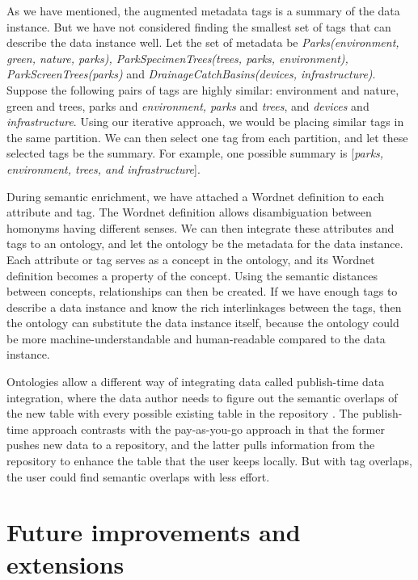 As we have mentioned, the augmented metadata tags is a summary of the data instance. But we have not considered finding the smallest set of tags that can describe the data instance well. Let the set of metadata be \textit{Parks(environment, green, nature, parks), ParkSpecimenTrees(trees, parks, environment), ParkScreenTrees(parks)} and \textit{DrainageCatchBasins(devices, infrastructure)}. Suppose the following pairs of tags are highly similar: environment and nature, green and trees, parks and \textit{environment, parks} and \textit{trees}, and \textit{devices} and \textit{infrastructure}. Using our iterative approach, we would be placing similar tags in the same partition. We can then select one tag from each partition, and let these selected tags be the summary. For example, one possible summary is [\textit{parks, environment, trees, and infrastructure}].

During semantic enrichment, we have attached a Wordnet definition to each attribute and tag. The Wordnet definition allows disambiguation between homonyms having different senses. We can then integrate these attributes and tags to an ontology, and let the ontology be the metadata for the data instance. Each attribute or tag serves as a concept in the ontology, and its Wordnet definition becomes a property of the concept. Using the semantic distances between concepts, relationships can then be created. If we have enough tags to describe a data instance and know the rich interlinkages between the tags, then the ontology can substitute the data instance itself, because the ontology could be more machine-understandable and human-readable compared to the data instance.

Ontologies allow a different way of integrating data called publish-time data integration, where the data author needs to figure out the semantic overlaps of the new table with every possible existing table in the repository \cite{Diego2018Machine}. The publish-time approach contrasts with the pay-as-you-go approach in that the former pushes new data to a repository, and the latter pulls information from the repository to enhance the table that the user keeps locally. But with tag overlaps, the user could find semantic overlaps with less effort.

\section{Future improvements and extensions}
\label{sec:FutureImprovementsAndExtensions}

